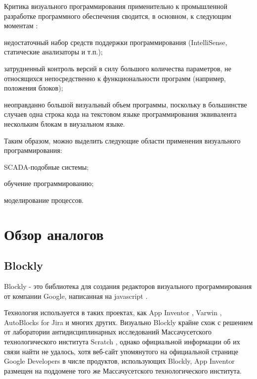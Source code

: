 Критика визуального программирования применительно к промышленной разработке программного обеспечения сводится, в основном, к следующим моментам \cite{vpl-crit}:

\begin{itemize*}
	\item недостаточный набор средств поддержки программирования (IntelliSense, статические анализаторы и т.п.);
	\item затрудненный контроль версий в силу большого количества параметров, не относящихся непосредственно к функциональности программ (например, положения блоков);
	\item неоправданно большой визуальный объем программы, поскольку в большинстве случаев одна строка кода на текстовом языке программирования эквивалента нескольким блокам в виузальном языке.
\end{itemize*}

Таким образом, можно выделить следующие области применения визуального программирования:

\begin{enumerate*}
	\item SCADA-подобные системы;
	\item обучение программированию;
	\item моделирование процессов.
\end{enumerate*}

\section{Обзор аналогов}
\subsection{Blockly}
Blockly - это библиотека для создания редакторов визуального программирования от компании Google, написанная на javascript \cite{blockly}.

Технология используется в таких проектах, как App Inventor \cite{app-inventor}, Varwin \cite{varwin}, AutoBlocks for Jira \cite{autoblocks} и многих других. Визуально Blockly крайне схож с решением от лаборатории антидисциплинарных исследований Массачусетского технологического института Scratch \cite{scratch}, однако официальной информации об их связи найти не удалось, хотя веб-сайт упомянутого на официальной странице Google Developers \cite{blockly} в числе продуктов, использующих Blockly, App Inventor размещен на поддомене того же Массачусетского технологического института.

